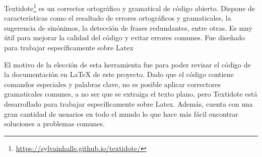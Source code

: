 Textidote\footnote{\url{https://sylvainhalle.github.io/textidote/}} es un corrector ortográfico y gramatical de código abierto. Dispone de características como el resaltado de errores ortográficos y gramaticales, la sugerencia de sinónimos, la detección de frases redundantes, entre otras. Es muy útil para mejorar la calidad del código y evitar errores comunes. Fue diseñado para trabajar específicamente sobre Latex\newline

El motivo de la elección de esta herramienta fue para poder revisar el código de la documentación en LaTeX de este proyecto. Dado que el código contiene comandos especiales y palabras clave, no es posible aplicar correctores gramaticales comunes, a no ser que se extraiga el texto plano, pero Textidote está desarrollado para trabajar específicamente sobre Latex. Además, cuenta con una gran cantidad de usuarios en todo el mundo lo que hace más fácil encontrar soluciones a problemas comunes.\newline